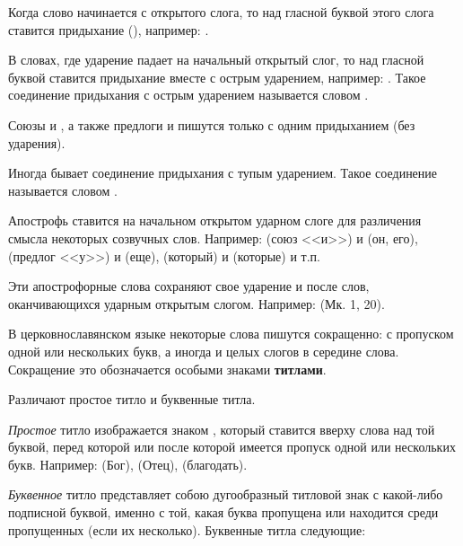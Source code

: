 \documentclass[11pt,a4paper,oneside]{memoir}
\newcommand{\mockitem}[1]{{\mock{#1}}}
\begin{document}
        \bigskip
        \mockitem{2. Придыхание}
        \medskip

        Когда слово начинается с открытого слога, то над гласной
        буквой этого слога ставится придыхание ({}),
        например: {}.

        В словах, где ударение падает на начальный открытый слог, то
        над гласной буквой ставится придыхание вместе с острым
        ударением, например: {}.
        Такое соединение придыхания с острым ударением называется
        словом {}.

        Союзы {} и {}, а также предлоги {} и
        {} пишутся только с одним придыханием (без ударения).

        Иногда бывает соединение придыхания с тупым ударением. Такое
        соединение называется словом {}.

        Апострофь ставится на начальном открытом ударном слоге для
        различения смысла некоторых созвучных слов. Например:
        {} (союз <<и>>) и {} (он, его), {}
        (предлог <<у>>) и {} (еще), {} (который)
        и {} (которые) и т.п.

        Эти апострофорные слова сохраняют свое ударение и после слов,
        оканчивающихся ударным открытым слогом. Например: {} (Мк. 1, 20).

        \bigskip
        \mockitem{3. Титла}
        \medskip

        В церковнославянском языке некоторые слова пишутся
        сокращенно: с пропуском одной или нескольких букв, а иногда и
        целых слогов в середине слова. Сокращение это обозначается
        особыми знаками \textbf{титлами}.

        Различают простое титло и буквенные титла.

        \emph{Простое} титло изображается знаком {}, который
        ставится вверху слова над той буквой, перед которой или после
        которой имеется пропуск одной или нескольких букв. Например:
        {} (Бог), {} (Отец), {}
        (благодать).

        \emph{Буквенное} титло представляет собою дугообразный
        титловой знак {} с какой-либо подписной буквой,
        именно с той, какая буква пропущена или находится среди
        пропущенных (если их несколько). Буквенные титла следующие:
\end{document}
